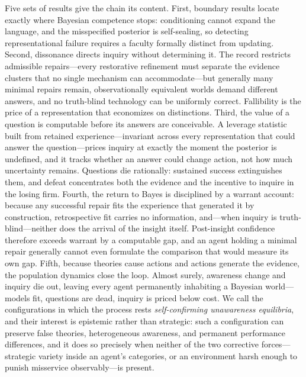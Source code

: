 \documentclass[11pt]{article}
\theoremstyle{definition}
\begin{document}
Five sets of results give the chain its content.  First, boundary results
locate exactly where Bayesian competence stops: conditioning cannot expand
the language, and the misspecified posterior is self-sealing, so detecting
representational failure requires a faculty formally distinct from
updating.  Second, dissonance directs inquiry without determining it.  The
record restricts admissible repairs---every restorative refinement must
separate the evidence clusters that no single mechanism can accommodate---but
generally many minimal repairs remain, observationally equivalent worlds
demand different answers, and no truth-blind technology can be uniformly
correct.  Fallibility is the price of a representation that economizes on
distinctions.  Third, the value of a question is computable before its
answers are conceivable.  A leverage statistic built from retained
experience---invariant across every representation that could answer the
question---prices inquiry at exactly the moment the posterior is undefined,
and it tracks whether an answer could change action, not how much uncertainty
remains.  Questions die rationally: sustained success extinguishes them,
and defeat concentrates both the evidence and the incentive to inquire in
the losing firm.  Fourth, the return to Bayes is disciplined by a warrant
account: because any successful repair fits the experience that generated it
by construction, retrospective fit carries no information, and---when
inquiry is truth-blind---neither does the arrival of the insight itself.
Post-insight confidence therefore exceeds warrant by a computable gap, and an
agent holding a minimal repair generally cannot even formulate the comparison
that would measure its own gap.  Fifth, because theories cause actions and
actions generate the evidence, the population dynamics close the loop.
Almost surely, awareness change and inquiry die out, leaving every agent
permanently inhabiting a Bayesian world---models fit, questions are dead,
inquiry is priced below cost.  We call the configurations in which the
process rests \emph{self-confirming unawareness equilibria}, and their
interest is epistemic rather than strategic: such a configuration can
preserve false theories, heterogeneous awareness, and permanent performance
differences, and it does so precisely when neither of the two corrective
forces---strategic variety inside an agent's categories, or an environment
harsh enough to punish misservice observably---is present.
\end{document}
